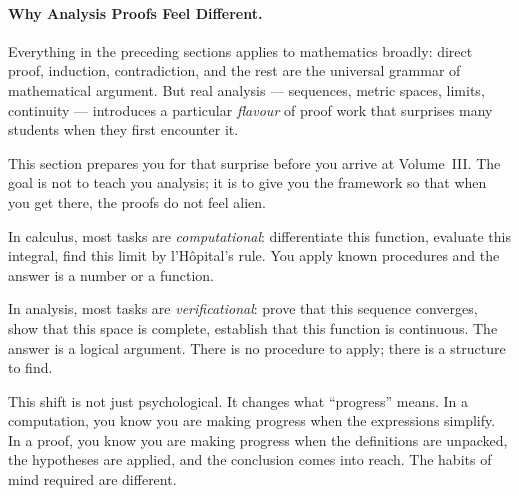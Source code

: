 \paragraph{Why Analysis Proofs Feel Different.}

Everything in the preceding sections applies to mathematics broadly:
direct proof, induction, contradiction, and the rest are the universal
grammar of mathematical argument. But real analysis --- sequences,
metric spaces, limits, continuity --- introduces a particular
\emph{flavour} of proof work that surprises many students when they
first encounter it.

This section prepares you for that surprise before you arrive at
Volume~III. The goal is not to teach you analysis; it is to give you
the framework so that when you get there, the proofs do not feel alien.

\begin{remark}
In calculus, most tasks are \emph{computational}: differentiate this
function, evaluate this integral, find this limit by l'H\^opital's rule.
You apply known procedures and the answer is a number or a function.

In analysis, most tasks are \emph{verificational}: prove that this
sequence converges, show that this space is complete, establish that
this function is continuous. The answer is a logical argument. There is
no procedure to apply; there is a structure to find.

This shift is not just psychological. It changes what ``progress''
means. In a computation, you know you are making progress when the
expressions simplify. In a proof, you know you are making progress
when the definitions are unpacked, the hypotheses are applied, and the
conclusion comes into reach. The habits of mind required are different.
\end{remark}

